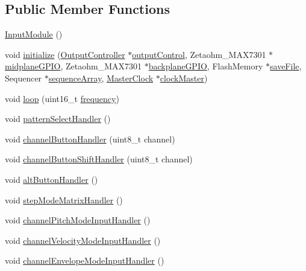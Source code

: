 \subsection*{Public Member Functions}
\begin{DoxyCompactItemize}
\item 
\hyperlink{class_input_module_a158c97df320462df4e6986be5a2b2646}{Input\+Module} ()
\item 
void \hyperlink{class_input_module_a789c6f0da21e6b5b89c7c6991f4ee745}{initialize} (\hyperlink{class_output_controller}{Output\+Controller} $\ast$\hyperlink{class_input_module_ad1019ec5aac3175710630718e056e471}{output\+Control}, Zetaohm\+\_\+\+M\+A\+X7301 $\ast$\hyperlink{class_input_module_ad23720995ebd07355df926bb18e2260d}{midplane\+G\+P\+IO}, Zetaohm\+\_\+\+M\+A\+X7301 $\ast$\hyperlink{class_input_module_a433abde922dee6f2abed80710f49a294}{backplane\+G\+P\+IO}, Flash\+Memory $\ast$\hyperlink{class_input_module_a0a4fbca5f978a217f47ed31082eaaecc}{save\+File}, Sequencer $\ast$\hyperlink{class_input_module_afdc54a8219ed5b5743201a00efd2cb72}{sequence\+Array}, \hyperlink{class_master_clock}{Master\+Clock} $\ast$\hyperlink{class_input_module_aff739621e5d47367263551f43d98b94b}{clock\+Master})
\item 
void \hyperlink{class_input_module_ad481ab7241ffe3a168e063a5afd6d892}{loop} (uint16\+\_\+t \hyperlink{global_8h_acdfc8898c9e67fbcec81f3b04ae61bd9}{frequency})
\item 
void \hyperlink{class_input_module_a92fa77f3667cbfdce6c2fbdc14854811}{pattern\+Select\+Handler} ()
\item 
void \hyperlink{class_input_module_a62ad05f2e4880aeae014d99ecfcd494d}{channel\+Button\+Handler} (uint8\+\_\+t channel)
\item 
void \hyperlink{class_input_module_a2e678e1a6f2d7b9f91a6e6f1e3125e89}{channel\+Button\+Shift\+Handler} (uint8\+\_\+t channel)
\item 
void \hyperlink{class_input_module_a1f93d0b1fc3269147f4d03a888ddb631}{alt\+Button\+Handler} ()
\item 
void \hyperlink{class_input_module_ada290dc92f0ad59826c47781ea2209c0}{step\+Mode\+Matrix\+Handler} ()
\item 
void \hyperlink{class_input_module_af8193a3e5f84adb8a139d624742b8c6a}{channel\+Pitch\+Mode\+Input\+Handler} ()
\item 
void \hyperlink{class_input_module_a30c140bcc298b2c7c382ef290e77071f}{channel\+Velocity\+Mode\+Input\+Handler} ()
\item 
void \hyperlink{class_input_module_a0ff214fef897f5dd0bd0384673742996}{channel\+Envelope\+Mode\+Input\+Handler} ()

\end{DoxyCompactItemize}
